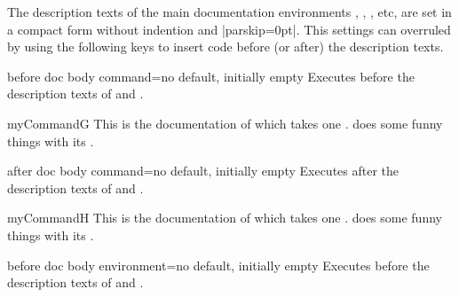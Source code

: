 \clearpage
The description texts of the main documentation environments ,
, , etc, are set in a compact form without
indention and |parskip=0pt|. This settings can overruled by using the following
keys to insert code before (or after) the description texts.

\begin{docTcbKey}[][doc new=2015-10-09]{before doc body command}{=}{no default, initially empty}
  Executes  before the description texts
  of  and .
\begin{dispExample}

\begin{docCommand*}{myCommandG}{}
  This is the documentation of  which takes one .
   does some funny things with its .
\end{docCommand*}
\end{dispExample}
\end{docTcbKey}


\begin{docTcbKey}[][doc new=2015-10-09]{after doc body command}{=}{no default, initially empty}
  Executes  after the description texts
  of  and .
\begin{dispExample}

\begin{docCommand*}{myCommandH}{}
  This is the documentation of  which takes one .
   does some funny things with its .
\end{docCommand*}
\end{dispExample}
\end{docTcbKey}


\begin{docTcbKey}[][doc new=2015-10-09]{before doc body environment}{=}{no default, initially empty}
  Executes  before the description texts
  of  and .
\end{docTcbKey}


